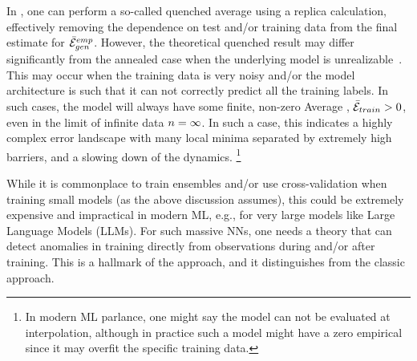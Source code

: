 In \STATMECH, one can perform a so-called quenched average using a replica calculation,
effectively removing the dependence on test and/or training data
from the final estimate for $\bar{\mathcal{E}}^{emp}_{gen}$.
However, the theoretical quenched result may differ significantly from the annealed case when the underlying model is unrealizable~\cite{SST92}. 
This may occur when the training data is very noisy and/or the model architecture is such that it can not correctly predict all the training labels.
In such cases, the model will always have some finite, non-zero Average \TrainingError, $\bar{\mathcal{E}}_{train} > 0$,
even in the \LargeN limit of infinite data $n=\infty$. In such a case, this indicates
a highly complex error landscape with many local minima separated by extremely high barriers,
and a slowing down of the dynamics.%
\footnote{In modern ML parlance, one might say the model can not be evaluated at interpolation, although 
in practice such a model might have a zero empirical \TrainingError since it may overfit the specific training data.}

While it is commonplace to train ensembles and/or use cross-validation when training small models (as the above discussion assumes),
this could be extremely expensive and impractical in modern ML, e.g., for very large models like Large Language Models (LLMs).
For such massive NNs, one needs a theory that can detect anomalies in training directly from observations during and/or after training.
This is a hallmark of the \SETOL approach, and it distinguishes \SETOL from the classic \STATMECH approach.



